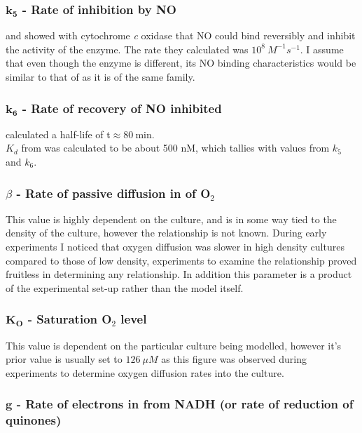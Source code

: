 \subsubsection*{$\mathbf{k_5}$ {\bf- Rate of \cbbthree{} inhibition by NO}}
\citet{Giuffre2000} and \citet{Blackmore1991} showed with cytochrome \textit{c} oxidase that NO could bind reversibly and inhibit the activity of the enzyme. The rate they calculated was $10^8~M ^{-1} s ^{-1}$. I assume that even though the enzyme is different, its NO binding characteristics would be similar to that of \cbbthree{} as it is of the same family.

\subsubsection*{$\mathbf{k_6}$ {\bf- Rate of recovery of NO inhibited \cbbthree{}}}
\citet{Giuffre2000} calculated a half-life of t\textonehalf $\approx 80~\mathrm{min}$.\\
$K_d$ from \citet{Rock2007} was calculated to be about 500 nM, which tallies with values from $k_5$ and $k_6$.

\subsubsection*{$\beta$ {\bf- Rate of passive diffusion in of O$_{\textrm{2}}$}}
This value is highly dependent on the culture, and is in some way tied to the density of the culture, however the relationship is not known. During early experiments I noticed that oxygen diffusion was slower in high density cultures compared to those of low density, experiments to examine the relationship proved fruitless in determining any relationship. In addition this parameter is a product of the experimental set-up rather than the model itself.

\subsubsection*{$\mathbf{K_O}$ {\bf- Saturation O$_{\textrm{2}}$ level}}
This value is dependent on the particular culture being modelled, however it's prior value is usually set to $126~\mu M$ as this figure was observed during experiments to determine oxygen diffusion rates into the culture.

\subsubsection*{$\mathbf{g}$ {\bf- Rate of electrons in from NADH (or rate of reduction of quinones)}}


